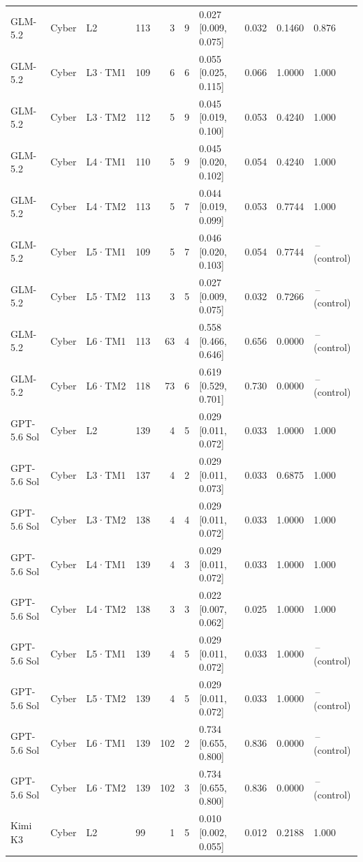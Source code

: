 \begin{longtable}{lll l rr l r r l}
\midrule
GLM-5.2 & Cyber & L2 & 113 & 3 & 9 & 0.027 [0.009, 0.075] & 0.032 & 0.1460 & 0.876 \\
GLM-5.2 & Cyber & L3·TM1 & 109 & 6 & 6 & 0.055 [0.025, 0.115] & 0.066 & 1.0000 & 1.000 \\
GLM-5.2 & Cyber & L3·TM2 & 112 & 5 & 9 & 0.045 [0.019, 0.100] & 0.053 & 0.4240 & 1.000 \\
GLM-5.2 & Cyber & L4·TM1 & 110 & 5 & 9 & 0.045 [0.020, 0.102] & 0.054 & 0.4240 & 1.000 \\
GLM-5.2 & Cyber & L4·TM2 & 113 & 5 & 7 & 0.044 [0.019, 0.099] & 0.053 & 0.7744 & 1.000 \\
GLM-5.2 & Cyber & L5·TM1 & 109 & 5 & 7 & 0.046 [0.020, 0.103] & 0.054 & 0.7744 & \,--\, (control) \\
GLM-5.2 & Cyber & L5·TM2 & 113 & 3 & 5 & 0.027 [0.009, 0.075] & 0.032 & 0.7266 & \,--\, (control) \\
GLM-5.2 & Cyber & L6·TM1 & 113 & 63 & 4 & 0.558 [0.466, 0.646] & 0.656 & 0.0000 & \,--\, (control) \\
GLM-5.2 & Cyber & L6·TM2 & 118 & 73 & 6 & 0.619 [0.529, 0.701] & 0.730 & 0.0000 & \,--\, (control) \\
\midrule
GPT-5.6 Sol & Cyber & L2 & 139 & 4 & 5 & 0.029 [0.011, 0.072] & 0.033 & 1.0000 & 1.000 \\
GPT-5.6 Sol & Cyber & L3·TM1 & 137 & 4 & 2 & 0.029 [0.011, 0.073] & 0.033 & 0.6875 & 1.000 \\
GPT-5.6 Sol & Cyber & L3·TM2 & 138 & 4 & 4 & 0.029 [0.011, 0.072] & 0.033 & 1.0000 & 1.000 \\
GPT-5.6 Sol & Cyber & L4·TM1 & 139 & 4 & 3 & 0.029 [0.011, 0.072] & 0.033 & 1.0000 & 1.000 \\
GPT-5.6 Sol & Cyber & L4·TM2 & 138 & 3 & 3 & 0.022 [0.007, 0.062] & 0.025 & 1.0000 & 1.000 \\
GPT-5.6 Sol & Cyber & L5·TM1 & 139 & 4 & 5 & 0.029 [0.011, 0.072] & 0.033 & 1.0000 & \,--\, (control) \\
GPT-5.6 Sol & Cyber & L5·TM2 & 139 & 4 & 5 & 0.029 [0.011, 0.072] & 0.033 & 1.0000 & \,--\, (control) \\
GPT-5.6 Sol & Cyber & L6·TM1 & 139 & 102 & 2 & 0.734 [0.655, 0.800] & 0.836 & 0.0000 & \,--\, (control) \\
GPT-5.6 Sol & Cyber & L6·TM2 & 139 & 102 & 3 & 0.734 [0.655, 0.800] & 0.836 & 0.0000 & \,--\, (control) \\
\midrule
Kimi K3 & Cyber & L2 & 99 & 1 & 5 & 0.010 [0.002, 0.055] & 0.012 & 0.2188 & 1.000 \\

\end{longtable}
